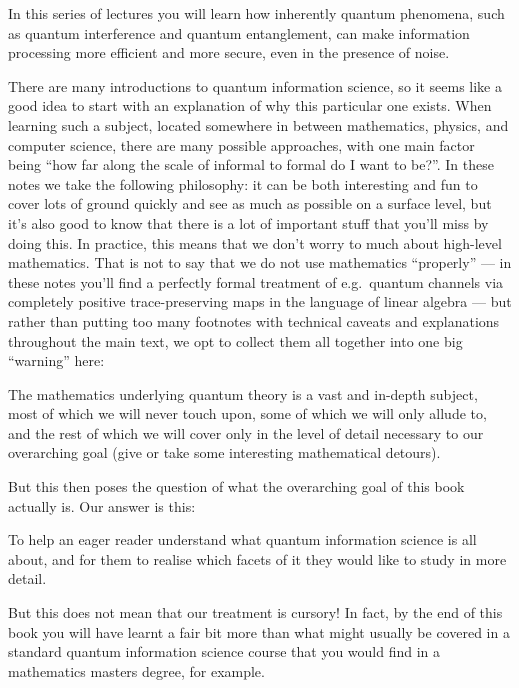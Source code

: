 \documentclass[fleqn,a4paper]{article}
\newenvironment{idea}{\everypar{\setlength{\parindent}{1.5em}}}{}
\theoremstyle{definition}
\theoremstyle{definition}
\theoremstyle{definition}
\theoremstyle{definition}
\theoremstyle{remark}
\begin{document}
In this series of lectures you will learn how inherently quantum phenomena, such as quantum interference and quantum entanglement, can make information processing more efficient and more secure, even in the presence of noise.

There are many introductions to quantum information science, so it seems like a good idea to start with an explanation of why this particular one exists.
When learning such a subject, located somewhere in between mathematics, physics, and computer science, there are many possible approaches, with one main factor being ``how far along the scale of informal to formal do I want to be?''.
In these notes we take the following philosophy: it can be both interesting and fun to cover lots of ground quickly and see as much as possible on a surface level, but it's also good to know that there is a lot of important stuff that you'll miss by doing this.
In practice, this means that we don't worry to much about high-level mathematics.
That is not to say that we do not use mathematics ``properly'' --- in these notes you'll find a perfectly formal treatment of e.g.~quantum channels via completely positive trace-preserving maps in the language of linear algebra --- but rather than putting too many footnotes with technical caveats and explanations throughout the main text, we opt to collect them all together into one big ``warning'' here:

\begin{idea}
The mathematics underlying quantum theory is a vast and in-depth subject, most of which we will never touch upon, some of which we will only allude to, and the rest of which we will cover only in the level of detail necessary to our overarching goal (give or take some interesting mathematical detours).

\end{idea}

But this then poses the question of what the overarching goal of this book actually is.
Our answer is this:

\begin{idea}
To help an eager reader understand what quantum information science is all about, and for them to realise which facets of it they would like to study in more detail.

\end{idea}

But this does not mean that our treatment is cursory!
In fact, by the end of this book you will have learnt a fair bit more than what might usually be covered in a standard quantum information science course that you would find in a mathematics masters degree, for example.
\end{document}
